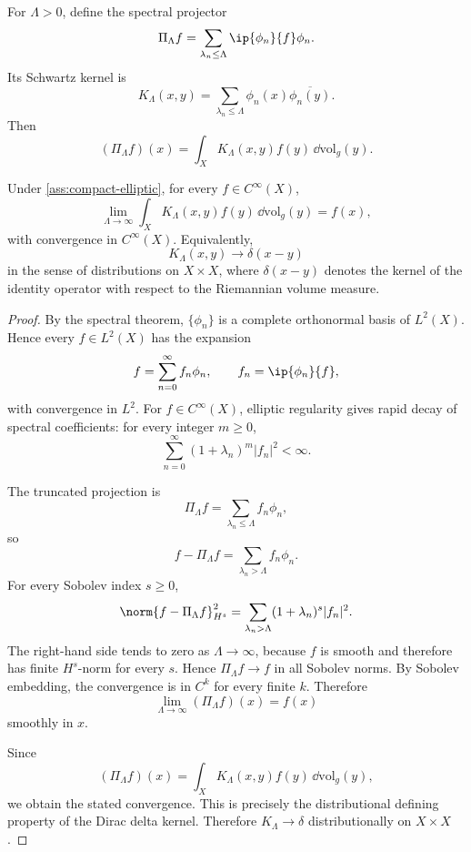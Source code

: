 \documentclass[11pt]{article}
\begin{document}
For \(\Lambda>0\), define the spectral projector
\begin{equation}
\Pi_\Lambda f=\sum_{\lambda_n\leq \Lambda}\ip{\phi_n}{f}\phi_n .
\end{equation}
Its Schwartz kernel is
\begin{equation}
K_\Lambda(x,y)=\sum_{\lambda_n\leq \Lambda}\phi_n(x)\overline{\phi_n(y)} .
\end{equation}
Then
\begin{equation}
(\Pi_\Lambda f)(x)=\int_X K_\Lambda(x,y)f(y)\,\dd\mathrm{vol}_g(y).
\end{equation}

\begin{theorem}\label{thm:spectral-delta}
Under \cref{ass:compact-elliptic}, for every \(f\in C^\infty(X)\),
\begin{equation}
\lim_{\Lambda\to\infty}\int_X K_\Lambda(x,y)f(y)\,\dd\mathrm{vol}_g(y)=f(x),
\end{equation}
with convergence in \(C^\infty(X)\).  Equivalently,
\begin{equation}
K_\Lambda(x,y)\longrightarrow \delta(x-y)
\end{equation}
in the sense of distributions on \(X\times X\), where \(\delta(x-y)\) denotes the kernel
of the identity operator with respect to the Riemannian volume measure.
\end{theorem}

\begin{proof}
By the spectral theorem, \(\{\phi_n\}\) is a complete orthonormal basis of \(L^2(X)\).
Hence every \(f\in L^2(X)\) has the expansion
\[
f=\sum_{n=0}^{\infty} f_n\phi_n,\qquad f_n=\ip{\phi_n}{f},
\]
with convergence in \(L^2\).  For \(f\in C^\infty(X)\), elliptic regularity gives rapid
decay of spectral coefficients: for every integer \(m\geq 0\),
\begin{equation}
\sum_{n=0}^{\infty}(1+\lambda_n)^m|f_n|^2<\infty .
\end{equation}

The truncated projection is
\[
\Pi_\Lambda f=\sum_{\lambda_n\leq \Lambda}f_n\phi_n,
\]
so
\[
f-\Pi_\Lambda f=\sum_{\lambda_n>\Lambda}f_n\phi_n.
\]
For every Sobolev index \(s\geq 0\),
\begin{equation}
\norm{f-\Pi_\Lambda f}_{H^s}^2
=\sum_{\lambda_n>\Lambda}(1+\lambda_n)^s|f_n|^2 .
\end{equation}
The right-hand side tends to zero as \(\Lambda\to\infty\), because \(f\) is smooth and
therefore has finite \(H^s\)-norm for every \(s\).  Hence \(\Pi_\Lambda f\to f\) in all
Sobolev norms.  By Sobolev embedding, the convergence is in \(C^k\) for every finite
\(k\).  Therefore
\[
\lim_{\Lambda\to\infty}(\Pi_\Lambda f)(x)=f(x)
\]
smoothly in \(x\).

Since
\[
(\Pi_\Lambda f)(x)=\int_X K_\Lambda(x,y)f(y)\,\dd\mathrm{vol}_g(y),
\]
we obtain the stated convergence.  This is precisely the distributional defining property
of the Dirac delta kernel.  Therefore \(K_\Lambda\to\delta\) distributionally on
\(X\times X\).
\end{proof}
\end{document}
